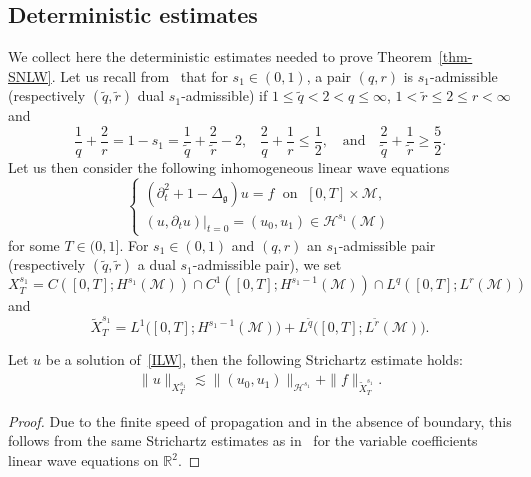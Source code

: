 \documentclass[AHL,Unicode,longabstracts,published]{cedram}
\newcommand{\R}{\mathbb{R}}
\newcommand{\M}{\mathcal{M}}
\renewcommand{\H}{\mathcal{H}}
\newcommand{\g}{\mathfrak{g}}
\newcommand{\Dlg}{\Delta_{\g}}
\newcommand{\dt}{\partial_t}
\newcommand{\les}{\lesssim}
\begin{document}
\subsection{Deterministic estimates}
We collect here the deterministic estimates needed to prove Theorem~\ref{thm-SNLW}. Let us recall from~\cite{GKO} that for $s_1\in (0,1)$, a pair $(q,r)$ is $s_1$-admissible (respectively $(\widetilde{q},\widetilde{r})$ dual $s_1$-admissible) if $1\leq \widetilde{q}<2<q\leq\infty$, $1<\widetilde{r}\leq 2 \leq r <\infty$ and
\begin{equation*}
\frac{1}{q}+\frac{2}{r}=1-s_1=\frac{1}{\widetilde{q}}+\frac{2}{\widetilde{r}}-2,\hspace{10pt}\frac{2}{q}+\frac{1}{r}\leq\frac12,\quad\text{and}\quad\frac{2}{\widetilde{q}}+\frac{1}{\widetilde{r}}\geq\frac52.
\end{equation*}
Let us then consider the following inhomogeneous linear wave equations
\begin{equation}\label{ILW}
\begin{cases}
\left(\dt^2+1-\Dlg\right)u = f\; \text{ on }\;[0,T]\times\M,\\
\left(u,\dt u\right)\big|_{t=0}=(u_0,u_1)\in \H^{s_1}(\M)
\end{cases}
\end{equation}
for some $T\in (0,1]$. For $s_1\in (0,1)$ and $(q,r)$ an $s_1$-admissible pair (respectively $(\widetilde{q},\widetilde{r})$ a dual $s_1$-admissible pair), we set
\begin{equation}\label{def-X}
X^{s_1}_T= C\left([0,T];H^{s_1}(\M)\right)\cap C^1\left([0,T];H^{s_1-1}(\M)\right)\cap L^q\left([0,T];L^r(\M)\right)
\end{equation}
and
\begin{equation*}
\widetilde{X}^{s_1}_T= L^1\big([0,T];H^{s_1-1}(\M)\big)+ L^{\widetilde{q}}\big([0,T];L^{\widetilde{r}}(\M)\big).
\end{equation*}

\begin{lemm}\label{lem-strichartz}
Let $u$ be a solution of~\eqref{ILW}, then the following Strichartz estimate holds:
\begin{align}\label{Strichartz}
\|u\|_{X^{s_1}_T}\les \|(u_0,u_1)\|_{\H^{s_1}}+\|f\|_{\widetilde{X}^{s_1}_T}.
\end{align}
\end{lemm}

\begin{proof}
Due to the finite speed of propagation and in the absence of boundary, this follows from the same Strichartz estimates as in~\cite{K,MSS} for the variable coefficients linear wave equations on $\R^2$.
\end{proof}
\end{document}
